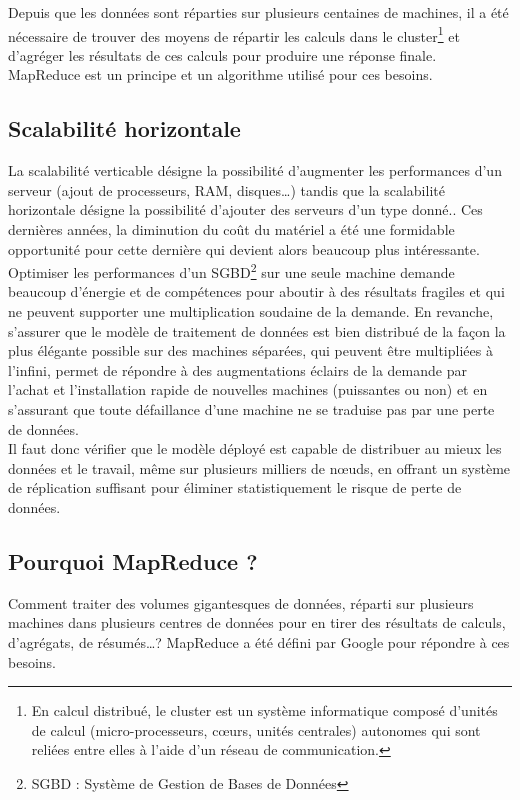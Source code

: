 Depuis que les données sont réparties sur plusieurs centaines de machines, il a été nécessaire de trouver des moyens de répartir les calculs dans le cluster\footnote{En calcul distribué, le cluster est un système informatique composé d'unités de calcul (micro-processeurs, cœurs, unités centrales) autonomes qui sont reliées entre elles à l'aide d'un réseau de communication.\cite{Wikipedia_cluster}} et d'agréger les résultats de ces calculs pour produire une réponse finale. MapReduce est un principe et un algorithme utilisé pour ces besoins.

\subsection{Scalabilité horizontale}
	La scalabilité verticable désigne la possibilité d'augmenter les performances d'un serveur (ajout de processeurs, RAM, disques\dots) tandis que la scalabilité horizontale désigne la possibilité d'ajouter des serveurs d'un type donné.\cite{Wikipedia_scalabilite}. Ces dernières années, la diminution du coût du matériel a été une formidable opportunité pour cette dernière qui devient alors beaucoup plus intéressante.\\

	Optimiser les performances d'un SGBD\footnote{SGBD : Système de Gestion de Bases de Données} sur une seule machine demande beaucoup d'énergie et de compétences pour aboutir à des résultats fragiles et qui ne peuvent supporter une multiplication soudaine de la demande. En revanche, s'assurer que le modèle de traitement de données est bien distribué de la façon la plus élégante possible sur des machines séparées, qui peuvent être multipliées à l'infini, permet de répondre à des augmentations éclairs de la demande par l'achat et l'installation rapide de nouvelles machines (puissantes ou non) et en s'assurant que toute défaillance d'une machine ne se traduise pas par une perte de données.\\

	Il faut donc vérifier que le modèle déployé est capable de distribuer au mieux les données et le travail, même sur plusieurs milliers de nœuds, en offrant un système de réplication suffisant pour éliminer statistiquement le risque de perte de données.

\subsection{Pourquoi MapReduce ?}
	Comment traiter des volumes gigantesques de données, réparti sur plusieurs machines dans plusieurs centres de données pour en tirer des résultats de calculs, d'agrégats, de résumés\dots ? MapReduce a été défini par Google pour répondre à ces besoins.

